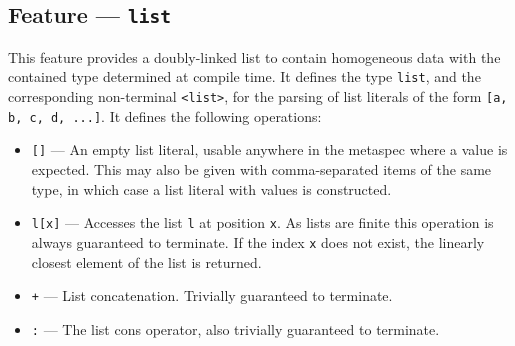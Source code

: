 
\subsection{Feature --- \texttt{list}} %
\label{sub:feature_list}
This feature provides a doubly-linked list to contain homogeneous data with the contained type determined at compile time. 
It defines the type \texttt{list}, and the corresponding non-terminal \texttt{<list>}, for the parsing of list literals of the form \texttt{[a, b, c, d, ...]}.
It defines the following operations:
\begin{itemize}
    \item \texttt{[]} --- An empty list literal, usable anywhere in the \gls{metaspec} where a value is expected. 
    This may also be given with comma-separated items of the same type, in which case a list literal with values is constructed.
    \item \texttt{l[x]} --- Accesses the list \texttt{l} at position \texttt{x}. 
    As lists are finite this operation is always guaranteed to terminate.
    If the index \texttt{x} does not exist, the linearly closest element of the list is returned. 
    \item \texttt{+} --- List concatenation.
    Trivially guaranteed to terminate.
    \item \texttt{:} --- The list cons operator, also trivially guaranteed to terminate.
\end{itemize}


